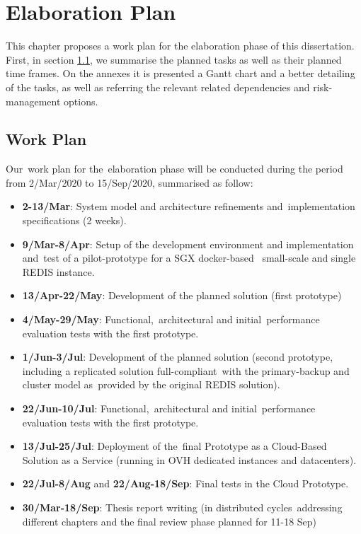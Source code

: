 
\chapter{Elaboration Plan}
\label{cha:elaboration_plan}

This chapter proposes a work plan for the elaboration phase of this dissertation. First, in section \ref{sec:workplan}, we summarise the planned tasks as well as their planned time frames. On the annexes it is presented a Gantt chart and a better detailing of the tasks, as well as referring the relevant related dependencies and risk-management options.

\section{Work Plan}
\label{sec:workplan}

Our work plan for the elaboration phase will be conducted during the period from 2/Mar/2020 to 15/Sep/2020, summarised as follow:

\begin{itemize}
	\item \textbf{2-13/Mar}: System model and architecture refinements and implementation specifications (2 weeks).
	\item \textbf{9/Mar-8/Apr}: Setup of the development environment and implementation and test of a pilot-prototype for a SGX docker-based  small-scale and single REDIS instance.
	\item \textbf{13/Apr-22/May}: Development of the planned solution (first prototype)
	\item \textbf{4/May-29/May}: Functional, architectural and initial performance evaluation tests with the first prototype.
	\item \textbf{1/Jun-3/Jul}: Development of the planned solution (second prototype, including a replicated solution full-compliant with the primary-backup and cluster model as provided by the original REDIS solution).
	\item \textbf{22/Jun-10/Jul}: Functional, architectural and initial performance evaluation tests with the first prototype.
	\item \textbf{13/Jul-25/Jul}: Deployment of the final Prototype as a Cloud-Based Solution as a Service (running in OVH dedicated instances and datacenters).
	\item \textbf{22/Jul-8/Aug} and \textbf{22/Aug-18/Sep}: Final tests in the Cloud Prototype.
	\item \textbf{30/Mar-18/Sep}: Thesis report writing (in distributed cycles addressing different chapters and the final review phase planned for 11-18 Sep)
\end{itemize}

